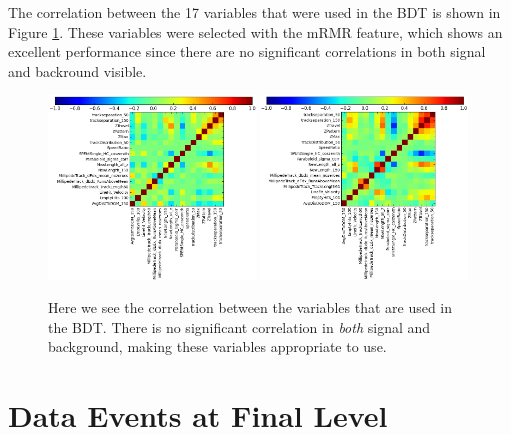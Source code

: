 \begin{appendices}
\noindent The correlation between the 17 variables that were used in the BDT is shown in Figure \ref{fig:correlation}. These variables were selected with the mRMR feature, which shows an excellent performance since there are no significant correlations in both signal and backround visible.
\begin{figure}[ht]
\centering
\includegraphics[width=0.49\textwidth]{appendix/img/correlationbackground.png}
\includegraphics[width=0.49\textwidth]{appendix/img/correlationsignal.png}
\caption{Here we see the correlation between the variables that are used in the BDT. There is no significant correlation in \textit{both} signal and background, making these variables appropriate to use.}
\label{fig:correlation}
\end{figure}


\usechapterimagefalse
{}
\chapter{Data Events at Final Level}
\label{ch:eventviewerFinal}
\usechapterimagetrue


\end{appendices}
